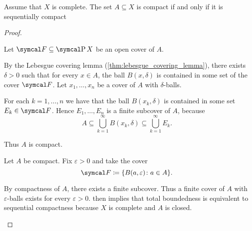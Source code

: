 \begin{theorem}\label{thm:metric_compact_iff_sequentially_compact}
  Assume that \( X \) is complete. The set \( A \subseteq X \) is compact if and only if it is sequentially compact
\end{theorem}
\begin{proof}
  \begin{description}
    \Implies Let \( \Cal{F} \subseteq \Power X \) be an open cover of \( A \).

    By the Lebesgue covering lemma (\cref{thm:lebesgue_covering_lemma}), there exists \( \delta > 0 \) such that for every \( x \in A \), the ball \( B(x, \delta) \) is contained in some set of the cover \( \Cal{F} \). Let \( x_1, \ldots, x_n \) be a cover of \( A \) with \( \delta \)-balls.

    For each \( k = 1, \ldots, n \) we have that the ball \( B(x_k, \delta) \) is contained in some set \( E_k \in \Cal{F} \). Hence \( E_1, \ldots, E_n \) is a finite subcover of \( A \), because
    \begin{equation*}
      A \subseteq \bigcup_{k=1}^\infty B(x_k, \delta) \subseteq \bigcup_{k=1}^\infty E_k.
    \end{equation*}

    Thus \( A \) is compact.

    \ImpliedBy Let \( A \) be compact. Fix \( \varepsilon > 0 \) and take the cover
    \begin{equation*}
      \Cal{F} \coloneqq \{ B(a, \varepsilon) \colon a \in A \}.
    \end{equation*}

    By compactness of \( A \), there exists a finite subcover. Thus a finite cover of \( A \) with \( \varepsilon \)-balls exists for every \( \varepsilon > 0 \).  then implies that total boundedness is equivalent to sequential compactness because \( X \) is complete and \( A \) is closed.
  \end{description}
\end{proof}

